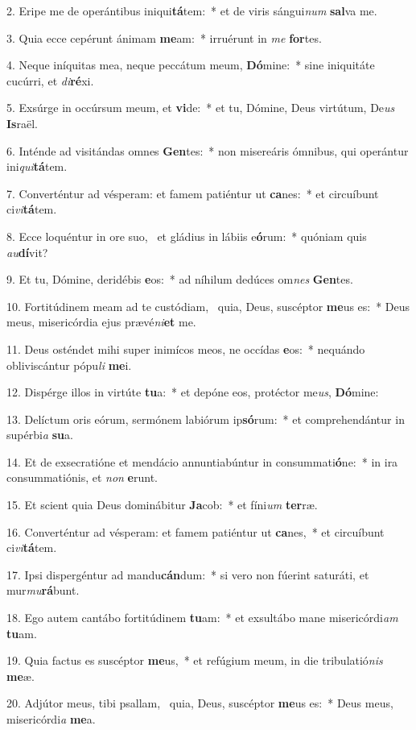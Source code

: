2. Eripe me de operántibus iniqui\textbf{tá}tem:~*  et de viris sángui\textit{num} \textbf{sal}va me.\

3. Quia ecce cepérunt ánimam \textbf{me}am:~*  irruérunt in \textit{me} \textbf{for}tes.\

4. Neque iníquitas mea, neque peccátum meum, \textbf{Dó}mine:~*  sine iniquitáte cucúrri, et \textit{di}\textbf{ré}xi.\

5. Exsúrge in occúrsum meum, et \textbf{vi}de:~*  et tu, Dómine, Deus virtútum, De\textit{us} \textbf{Is}raël.\

6. Inténde ad visitándas omnes \textbf{Gen}tes:~*  non misereáris ómnibus, qui operántur ini\textit{qui}\textbf{tá}tem.\

7. Converténtur ad vésperam: et famem patiéntur ut \textbf{ca}nes:~*  et circuíbunt ci\textit{vi}\textbf{tá}tem.\

8. Ecce loquéntur in ore suo, \dag\  et gládius in lábiis e\textbf{ó}rum:~*  quóniam quis \textit{au}\textbf{dí}vit?\

9. Et tu, Dómine, deridébis \textbf{e}os:~*  ad níhilum dedúces om\textit{nes} \textbf{Gen}tes.\

10. Fortitúdinem meam ad te custódiam, \dag\  quia, Deus, suscéptor \textbf{me}us es:~*  Deus meus, misericórdia ejus prævé\textit{ni}\textbf{et} me.\

11. Deus osténdet mihi super inimícos meos, ne occídas \textbf{e}os:~*  nequándo obliviscántur pópu\textit{li} \textbf{me}i.\

12. Dispérge illos in virtúte \textbf{tu}a:~*  et depóne eos, protéctor me\textit{us}, \textbf{Dó}mine:\

13. Delíctum oris eórum, sermónem labiórum ip\textbf{só}rum:~*  et comprehendántur in supérbi\textit{a} \textbf{su}a.\

14. Et de exsecratióne et mendácio annuntiabúntur in consummati\textbf{ó}ne:~*  in ira consummatiónis, et \textit{non} \textbf{e}runt.\

15. Et scient quia Deus dominábitur \textbf{Ja}cob:~*  et fíni\textit{um} \textbf{ter}ræ.\

16. Converténtur ad vésperam: et famem patiéntur ut \textbf{ca}nes,~*  et circuíbunt ci\textit{vi}\textbf{tá}tem.\

17. Ipsi dispergéntur ad mandu\textbf{cán}dum:~*  si vero non fúerint saturáti, et mur\textit{mu}\textbf{rá}bunt.\

18. Ego autem cantábo fortitúdinem \textbf{tu}am:~*  et exsultábo mane misericórdi\textit{am} \textbf{tu}am.\

19. Quia factus es suscéptor \textbf{me}us,~*  et refúgium meum, in die tribulatió\textit{nis} \textbf{me}æ.\

20. Adjútor meus, tibi psallam, \dag\  quia, Deus, suscéptor \textbf{me}us es:~*  Deus meus, misericórdi\textit{a} \textbf{me}a.\


